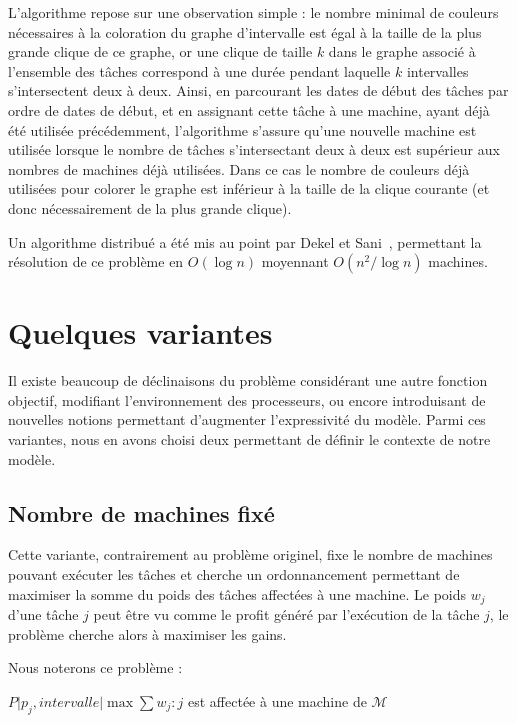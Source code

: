 \documentclass[a4paper,11pt]{report}
\begin{document}
L'algorithme repose sur une observation simple : le nombre minimal de couleurs nécessaires à la
coloration du graphe d'intervalle est égal à la taille de la plus grande clique de ce graphe, or une
clique de taille $k$ dans le graphe associé à l'ensemble des tâches correspond à une durée pendant
laquelle $k$ intervalles s'intersectent deux à deux. Ainsi, en parcourant les dates de début des tâches par
ordre de dates de début, et en assignant cette tâche à une machine, ayant déjà été utilisée
précédemment, l'algorithme s'assure qu'une nouvelle machine est utilisée lorsque le nombre de
tâches s'intersectant deux à deux est supérieur aux nombres de machines déjà utilisées. Dans ce cas
le nombre de couleurs déjà utilisées pour colorer le graphe est inférieur à la taille de la clique
courante (et donc nécessairement de la plus grande clique).

Un algorithme distribué a été mis au point par Dekel et Sani~\cite{dekel1983parallel}, permettant la
résolution de ce problème en $O(\log n)$ moyennant $O(n^2 / \log n)$ machines.

\section{Quelques variantes}

Il existe beaucoup de déclinaisons du problème \bisched{} considérant une autre fonction objectif,
modifiant l'environnement des processeurs, ou encore introduisant de nouvelles notions permettant
d'augmenter l'expressivité du modèle. Parmi ces variantes, nous en avons choisi deux permettant de
définir le contexte de notre modèle.

\subsection{Nombre de machines fixé}

Cette variante, contrairement au problème originel, fixe le nombre de machines pouvant exécuter les
tâches et cherche un ordonnancement permettant de maximiser la somme du poids des tâches affectées à
une machine. Le poids $w_j$ d'une tâche $j$ peut être vu comme le profit généré par l'exécution de
la tâche $j$, le problème cherche alors à maximiser les gains.

Nous noterons ce problème :
\begin{center}
    $P \Big| p_j, intervalle \Big| \max \sum w_j : j$ est affectée à une machine de $\mathcal{M}$
\end{center}
\end{document}

